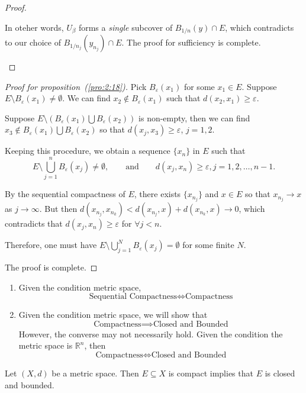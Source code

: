 \begin{proof}
\begin{itemize}
In oteher words, $U_\beta$ forms a \emph{single} subcover of $B_{1/n}(y)\cap E$, which contradicts to our choice of $B_{1/n_j}(y_{n_j})\cap E$. 
The proof for sufficiency is complete.
\end{itemize}
\end{proof}
\begin{proof}[Proof for proposition~(\ref{pro:2:18})]
Pick $B_\varepsilon(x_1)$ for some $x_1\in E$. 
Suppose $E\setminus B_\varepsilon(x_1)\ne\emptyset$.
We can find $x_2\notin B_\varepsilon(x_1)$ such that $d(x_2,x_1)\ge\varepsilon$.

Suppose $E\setminus(B_\varepsilon(x_1)\bigcup B_\varepsilon(x_2))$ is non-empty, 
then we can find $x_3\notin B_\varepsilon(x_1)\bigcup B_\varepsilon(x_2)$ 
so that $d(x_j,x_3)\ge\varepsilon$, $j=1,2$.

Keeping this procedure, we obtain a sequence $\{x_n\}$ in $E$ such that
\[
E\setminus\bigcup_{j=1}^nB_\varepsilon(x_j)\ne\emptyset,
\qquad
\text{and}
\qquad
d(x_j,x_n)\ge\varepsilon,j=1,2,\dots,n-1.
\]

By the sequential compactness of $E$, 
there exists $\{x_{n_j}\}$ and $x\in E$ so that $x_{n_j}\to x$ as $j\to\infty$.
But then $d(x_{n_j},x_{n_k})<d(x_{n_j},x)+d(x_{n_k},x)\to0$, 
which contradicts that $d(x_j,x_n)\ge\varepsilon$ for $\forall j<n$.

Therefore, one must have 
$E\setminus \bigcup_{j=1}^NB_\varepsilon(x_j)=\emptyset$ for some finite $N$. 

The proof is complete.
\end{proof}

\begin{remark}
\begin{enumerate}
\item
Given the condition metric space,
\[
\text{Sequential Compactness}
\Longleftrightarrow
\text{Compactness}
\]
\item
Given the condition metric space, we will show that 
\[
\text{Compactness}
\implies
\text{Closed and Bounded}
\]
However, the converse may not necessarily hold. Given the condition the metric space is $\mathbb{R}^n$, then
\[
\text{Compactness}
\Longleftrightarrow
\text{Closed and Bounded}
\]
\end{enumerate}


\end{remark}

\begin{proposition}
Let $(X,d)$ be a metric space. Then $E\subseteq X$ is compact implies that $E$ is closed and bounded.
\end{proposition}

